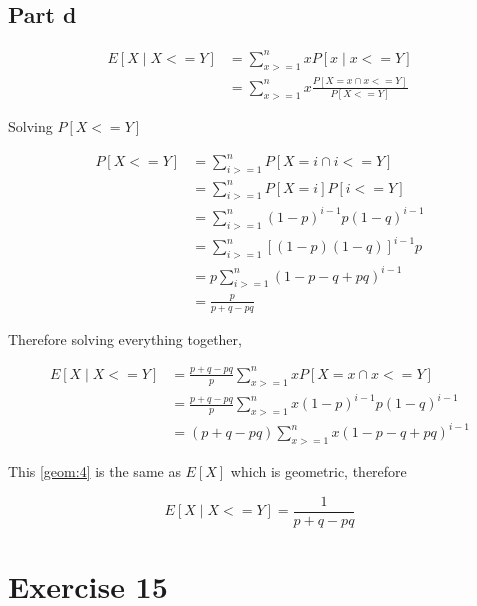 \documentclass[12pt, a4paper]{article}
\begin{document}
\subsection{Part d}

\begin{subequations}
  \begin{align}
    E[X \mid X <= Y] &= \displaystyle\sum_{x>=1}^{n} x P[x \mid x <= Y] \\
                     &= \displaystyle\sum_{x>=1}^{n} x \frac{P[X=x \cap x <= Y]}{P[X<=Y]}
  \end{align}
\end{subequations}


Solving $P[X<=Y]$

\begin{subequations}
  \begin{align}
    P[X<=Y] &= \sum_{i>=1}^{n} P[X = i \cap i <= Y] \\
            &= \sum_{i>=1}^{n} P[X=i]P[i<=Y] \\
            &= \sum_{i>=1}^{n} (1-p)^{i-1}p(1-q)^{i-1} \\
            &= \sum_{i>=1}^{n} [(1-p)(1-q)]^{i-1}p \\
            &= p \sum_{i>=1}^{n} (1 - p - q + pq)^{i-1} \\
            &= \frac{p}{p + q - pq} \label{geom:3}             
  \end{align}
\end{subequations}

Therefore solving everything together,

\begin{subequations}
  \begin{align}
    E[X \mid X <= Y] &= \frac{p+q-pq}{p} \displaystyle\sum_{x>=1}^{n} x P[X=x \cap x <= Y] \\
                     &= \frac{p+q-pq}{p} \displaystyle\sum_{x>=1}^{n} x (1-p)^{i-1}p(1-q)^{i-1} \\
                     &= (p+q-pq) \displaystyle\sum_{x>=1}^{n} x (1 - p - q + pq)^{i-1} \label{geom:4}
  \end{align}
\end{subequations}


This \ref{geom:4} is the same as $E[X]$ which is geometric, therefore 

\begin{equation}
    E[X \mid X <= Y] = \frac{1}{p+q-pq} 
\end{equation}

\section{Exercise 15}
\end{document}
